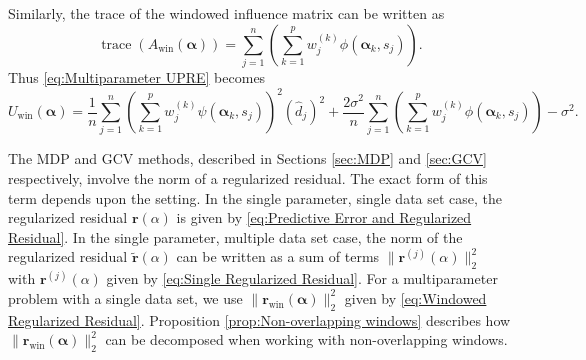 \documentclass[12pt]{article}
\newcommand{\rVec}{\mathbf{r}}	%
\DeclareMathOperator{\trace}{trace}		%
\newcommand{\dft}[1]{\widehat{#1}}	%
\newcommand{\regparam}{\alpha}  %
\newcommand{\regparamVec}{\bm{\regparam}}   %
\newcommand{\filt}{\phi}
\newcommand{\mfilt}{\psi}
\newcommand{\noiseSD}{\sigma}	%
\newcommand{\singular}{s}	%
\begin{document}
Similarly, the trace of the windowed influence matrix can be written as
\begin{equation}
    \trace\left(A_\text{win}(\regparamVec)\right) = \sum_{j=1}^{n} \left(\sum_{k=1}^{p} w_j^{(k)} \filt\left(\regparamVec_{k},\singular_j\right) \right).
\end{equation}
Thus \eqref{eq:Multiparameter UPRE} becomes
\begin{equation}
\label{eq:Multiparameter UPRE 2}
    U_\text{win}(\regparamVec) = \frac{1}{n}\sum_{j=1}^{n} \left(\sum_{k=1}^{p} w_j^{(k)} \mfilt\left(\regparamVec_{k},\singular_j\right) \right)^2 \left(\dft{d}_j\right)^2 + \frac{2\noiseSD^2}{n}\sum_{j=1}^{n} \left(\sum_{k=1}^{p} w_j^{(k)} \filt\left(\regparamVec_{k},\singular_j\right) \right) - \noiseSD^2.
\end{equation}

The MDP and GCV methods, described in Sections \ref{sec:MDP} and \ref{sec:GCV} respectively, involve the norm of a regularized residual. The exact form of this term depends upon the setting. In the single parameter, single data set case, the regularized residual $\rVec(\regparam)$ is given by \eqref{eq:Predictive Error and Regularized Residual}. In the single parameter, multiple data set case, the norm of the regularized residual $\widetilde{\rVec}(\regparam)$ can be written as a sum of terms $\|\rVec^{(j)}(\regparam)\|_2^2$ with $\rVec^{(j)}(\regparam)$ given by \eqref{eq:Single Regularized Residual}. For a multiparameter problem with a single data set, we use $\|\rVec_{\text{win}}(\regparamVec)\|_2^2$ given by \eqref{eq:Windowed Regularized Residual}. Proposition \ref{prop:Non-overlapping windows} describes how $\|\rVec_{\text{win}}(\regparamVec)\|_2^2$ can be decomposed when working with non-overlapping windows.
\end{document}

